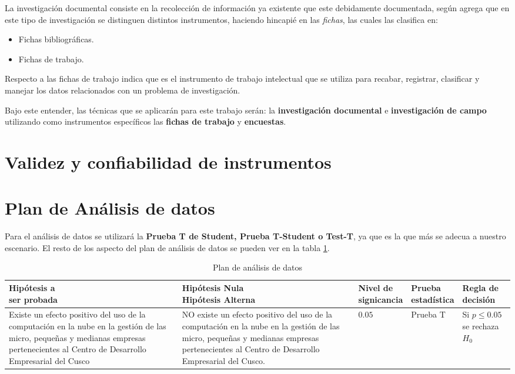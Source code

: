 La investigación documental consiste en la recolección de información ya existente
que este debidamente documentada, según \cite{robledo} agrega que en este tipo
de investigación se distinguen distintos instrumentos, haciendo hincapié en las
\emph{fichas}, las cuales \citep{robledo} las clasifica en:
\begin{itemize}
    \item Fichas bibliográficas.
    \item Fichas de trabajo.
\end{itemize}

Respecto a las fichas de trabajo \cite{robledo} indica que es el instrumento de
trabajo intelectual que se utiliza para recabar, registrar, clasificar y
manejar los datos relacionados con un problema de investigación.

Bajo este entender, las técnicas que se aplicarán para este trabajo serán:
la \textbf{investigación documental} e \textbf{investigación de campo} utilizando
como instrumentos específicos las \textbf{fichas de trabajo} y \textbf{encuestas}.

\section{Validez y confiabilidad de instrumentos}

\section{Plan de Análisis de datos}
Para el análisis de datos se utilizará la \textbf{Prueba T de Student, Prueba
T-Student o Test-T}, ya que es la que más se adecua a nuestro escenario. El resto
de los aspecto del plan de análisis de datos se pueden ver en la tabla \ref{t:analisis_datos}.

\begin{table}[htbp]
\centering
\caption{Plan de análisis de datos}
\label{t:analisis_datos}
\begin{tabular}{|p{4cm}|p{4cm}|p{2cm}|p{2cm}|p{2cm}|}
  \hline
\thead{Hipótesis a \\ser probada} & \thead{Hipótesis Nula \\Hipótesis Alterna} & \thead{Nivel de \\signicancia} & \thead{Prueba \\estadística} & \thead{Regla de \\decisión} \\ \hline
Existe un efecto positivo del uso de la computación en la nube en la gestión de las micro,
pequeñas y medianas empresas pertenecientes al Centro de Desarrollo Empresarial del Cusco &
NO existe un efecto positivo del uso de la computación en la nube en la gestión
de las micro, pequeñas y medianas empresas pertenecientes al Centro de Desarrollo
Empresarial del Cusco. &
$0.05$ & Prueba T & Si $p \leq 0.05$ se rechaza $H_0$\\ \hline
\end{tabular}
\end{table}
